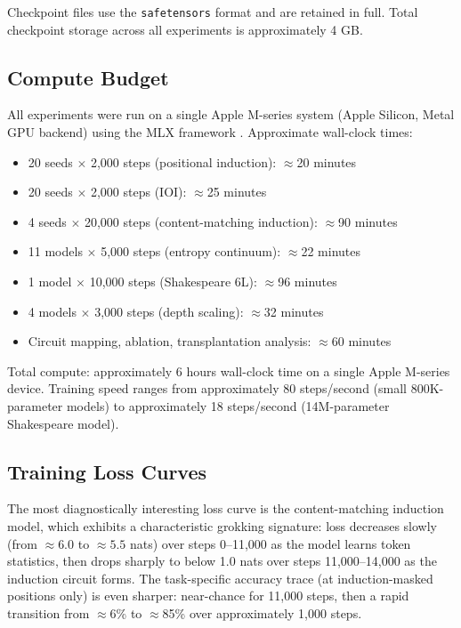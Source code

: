Checkpoint files use the \texttt{safetensors} format and are retained in full. Total checkpoint
storage across all experiments is approximately 4 GB.

\subsection{Compute Budget}

All experiments were run on a single Apple M-series system (Apple Silicon, Metal GPU backend)
using the MLX framework \cite{mlx2023}. Approximate wall-clock times:

\begin{itemize}
    \item 20 seeds $\times$ 2,000 steps (positional induction): $\approx$20 minutes
    \item 20 seeds $\times$ 2,000 steps (IOI): $\approx$25 minutes
    \item 4 seeds $\times$ 20,000 steps (content-matching induction): $\approx$90 minutes
    \item 11 models $\times$ 5,000 steps (entropy continuum): $\approx$22 minutes
    \item 1 model $\times$ 10,000 steps (Shakespeare 6L): $\approx$96 minutes
    \item 4 models $\times$ 3,000 steps (depth scaling): $\approx$32 minutes
    \item Circuit mapping, ablation, transplantation analysis: $\approx$60 minutes
\end{itemize}

Total compute: approximately 6 hours wall-clock time on a single Apple M-series device.
Training speed ranges from approximately 80 steps/second (small 800K-parameter models) to
approximately 18 steps/second (14M-parameter Shakespeare model).

\subsection{Training Loss Curves}

The most diagnostically interesting loss curve is the content-matching induction model, which
exhibits a characteristic grokking signature: loss decreases slowly (from $\approx 6.0$ to
$\approx 5.5$ nats) over steps 0--11,000 as the model learns token statistics, then drops
sharply to below 1.0 nats over steps 11,000--14,000 as the induction circuit forms. The
task-specific accuracy trace (at induction-masked positions only) is even sharper: near-chance
for 11,000 steps, then a rapid transition from $\approx$6\% to $\approx$85\% over approximately
1,000 steps.

